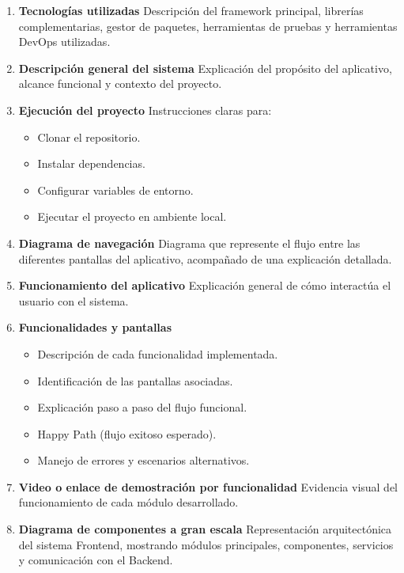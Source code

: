 \documentclass[12pt]{article}
\begin{document}
\begin{enumerate}
    \item \textbf{Tecnologías utilizadas}  
    Descripción del framework principal, librerías complementarias, gestor de paquetes, herramientas de pruebas y herramientas DevOps utilizadas.

    \item \textbf{Descripción general del sistema}  
    Explicación del propósito del aplicativo, alcance funcional y contexto del proyecto.

    \item \textbf{Ejecución del proyecto}  
    Instrucciones claras para:
    \begin{itemize}
        \item Clonar el repositorio.
        \item Instalar dependencias.
        \item Configurar variables de entorno.
        \item Ejecutar el proyecto en ambiente local.
    \end{itemize}

    \item \textbf{Diagrama de navegación}  
    Diagrama que represente el flujo entre las diferentes pantallas del aplicativo, acompañado de una explicación detallada.

    \item \textbf{Funcionamiento del aplicativo}  
    Explicación general de cómo interactúa el usuario con el sistema.

    \item \textbf{Funcionalidades y pantallas}
    \begin{itemize}
        \item Descripción de cada funcionalidad implementada.
        \item Identificación de las pantallas asociadas.
        \item Explicación paso a paso del flujo funcional.
        \item Happy Path (flujo exitoso esperado).
        \item Manejo de errores y escenarios alternativos.
    \end{itemize}

    \item \textbf{Video o enlace de demostración por funcionalidad}  
    Evidencia visual del funcionamiento de cada módulo desarrollado.

    \item \textbf{Diagrama de componentes a gran escala}  
    Representación arquitectónica del sistema Frontend, mostrando módulos principales, componentes, servicios y comunicación con el Backend.


\end{enumerate}
\end{document}
